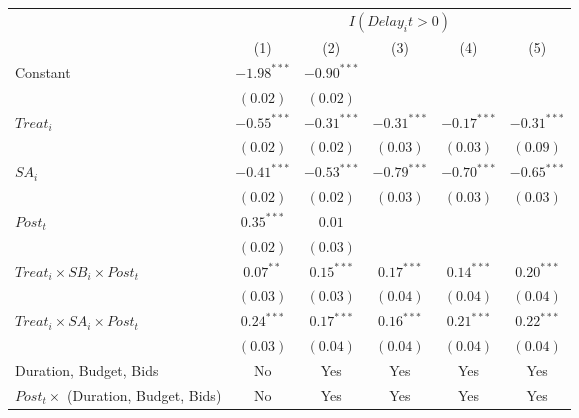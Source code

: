 \documentclass[
]{article}
\begin{document}
\begin{table}
\begin{center}
\begin{tabular}{l c c c c c}
\hline
 & \multicolumn{5}{c}{$I(Delay_it>0)$} \\
\cline{2-6}
 & (1) & (2) & (3) & (4) & (5) \\
\hline
Constant                                   & $-1.98^{***}$ & $-0.90^{***}$ &               &               &               \\
                                           & $(0.02)$      & $(0.02)$      &               &               &               \\
$Treat_i$                                  & $-0.55^{***}$ & $-0.31^{***}$ & $-0.31^{***}$ & $-0.17^{***}$ & $-0.31^{***}$ \\
                                           & $(0.02)$      & $(0.02)$      & $(0.03)$      & $(0.03)$      & $(0.09)$      \\
$SA_i$                                     & $-0.41^{***}$ & $-0.53^{***}$ & $-0.79^{***}$ & $-0.70^{***}$ & $-0.65^{***}$ \\
                                           & $(0.02)$      & $(0.02)$      & $(0.03)$      & $(0.03)$      & $(0.03)$      \\
$Post_t$                                   & $0.35^{***}$  & $0.01$        &               &               &               \\
                                           & $(0.02)$      & $(0.03)$      &               &               &               \\
$Treat_i \times SB_i \times Post_t$        & $0.07^{**}$   & $0.15^{***}$  & $0.17^{***}$  & $0.14^{***}$  & $0.20^{***}$  \\
                                           & $(0.03)$      & $(0.03)$      & $(0.04)$      & $(0.04)$      & $(0.04)$      \\
$Treat_i \times SA_i \times Post_t$        & $0.24^{***}$  & $0.17^{***}$  & $0.16^{***}$  & $0.21^{***}$  & $0.22^{***}$  \\
                                           & $(0.03)$      & $(0.04)$      & $(0.04)$      & $(0.04)$      & $(0.04)$      \\
\hline
Duration, Budget, Bids                     & No            & Yes           & Yes           & Yes           & Yes           \\
$Post_t \times $  (Duration, Budget, Bids) & No            & Yes           & Yes           & Yes           & Yes           \\

\end{tabular}
\end{center}
\end{table}
\end{document}

